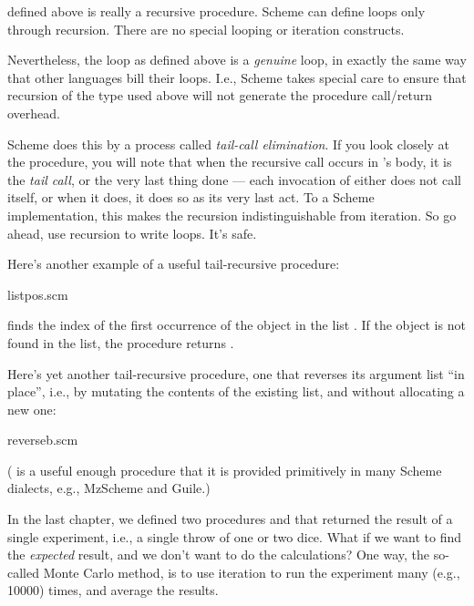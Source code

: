  defined above is really a recursive
procedure.  Scheme can define loops only through
recursion.  There are no special looping or iteration
constructs.

Nevertheless, the loop as defined above is a {\em
genuine} loop, in exactly the same way that other
languages bill their loops.  I.e., Scheme takes special
care to ensure that recursion of the type used above
will not generate the procedure call/return overhead.

Scheme does this by a process called {\em tail-call
elimination}.  If you look closely at the 
procedure, you will note that when the recursive call
occurs in ’s body, it is the {\em tail call},
or the very last thing done — each invocation of
 either does not call itself, or when it
does, it does so as its very last act.  To a Scheme
implementation, this makes the recursion
indistinguishable from iteration.  So go ahead, use
recursion to write loops.  It’s safe.

Here’s another example of a useful tail-recursive
procedure:

\scmfilename listpos.scm

\n {} finds the index of the first
occurrence of the object  in the list .  If
the object is not found in the list, the procedure
returns .

Here’s yet another tail-recursive procedure, one that
reverses its argument list “in place”, i.e., by mutating
the contents of the existing list, and without
allocating a new one:

\scmfilename reverseb.scm

\n
( is a useful enough procedure that it is
provided primitively in many Scheme dialects, e.g.,
MzScheme and Guile.)

In the last chapter, we defined two procedures 
and  that returned the result of a single
experiment, i.e., a single throw of one or two dice. What if we
want to find the {\em expected} result, and we don't want to do the
calculations? One way, the so-called Monte Carlo method, is to
use iteration to
run the experiment many (e.g., 10000) times, and average the results.


